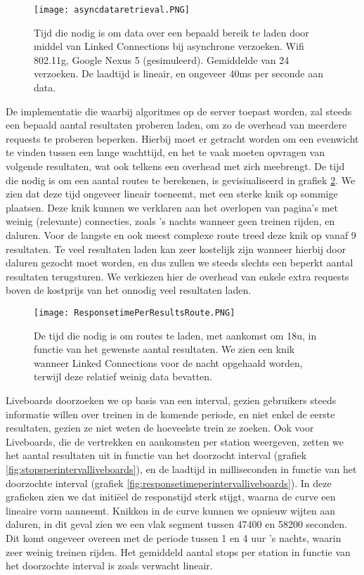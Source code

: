\begin{figure}
	\centering
	\texttt{[image: asyncdataretrieval.PNG]}
	\caption[Laadtijd asynchroon laden Linked Connections]{Tijd die nodig is om data over een bepaald bereik te laden door middel van Linked Connections bij asynchrone verzoeken. Wifi 802.11g, Google Nexus 5 (gesimuleerd). Gemiddelde van 24 verzoeken. De laadtijd is lineair, en ongeveer 40ms per seconde aan data.}
	\label{fig:asyncdataretrieval}
\end{figure}

De implementatie die waarbij algoritmes op de server toepast worden, zal steeds een bepaald aantal resultaten proberen laden, om zo de overhead van meerdere requests te proberen beperken. Hierbij moet er getracht worden om een evenwicht te vinden tussen een lange wachttijd, en het te vaak moeten opvragen van volgende resultaten, wat ook telkens een overhead met zich meebrengt. De tijd die nodig is om een aantal routes te berekenen, is gevisiualiseerd in grafiek \ref{fig:responsetimeperresultsroute}. We zien dat deze tijd ongeveer lineair toeneemt, met een sterke knik op sommige plaatsen. Deze knik kunnen we verklaren aan het overlopen van pagina's met weinig (relevante) connecties, zoals 's nachts wanneer geen treinen rijden, en daluren. Voor de langste en ook meest complexe route treed deze knik op vanaf 9 resultaten. Te veel resultaten laden kan zeer kostelijk zijn wanneer hierbij door daluren gezocht moet worden, en dus zullen we steeds slechts een beperkt aantal resultaten terugsturen. We verkiezen hier de overhead van enkele extra requests boven de kostprijs van het onnodig veel resultaten laden.

\begin{figure}
	\centering
	\texttt{[image: ResponsetimePerResultsRoute.PNG]}
	\caption[Laadtijd routes in functie van aantal resultaten]{De tijd die nodig is om routes te laden, met aankomst om 18u, in functie van het gewenste aantal resultaten. We zien een knik wanneer Linked Connections voor de nacht opgehaald worden, terwijl deze relatief weinig data bevatten.}
	\label{fig:responsetimeperresultsroute}
\end{figure}

Liveboards doorzoeken we op basis van een interval, gezien gebruikers steeds informatie willen over treinen in de komende periode, en niet enkel de eerste resultaten, gezien ze niet weten de hoeveelste trein ze zoeken. Ook voor Liveboards, die de vertrekken en aankomsten per station weergeven, zetten we het aantal resultaten uit in functie van het doorzocht interval (grafiek \ref{fig:stopsperintervalliveboards}), en de laadtijd in milliseconden in functie van het doorzochte interval (grafiek \ref{fig:responsetimeperintervalliveboards}). In deze grafieken zien we dat initiëel de responstijd sterk stijgt, waarna de curve een lineaire vorm aanneemt. Knikken in de curve kunnen we opnieuw wijten aan daluren, in dit geval zien we een vlak segment tussen 47400 en 58200 seconden. Dit komt ongeveer overeen met de periode tussen 1 en 4 uur 's nachts, waarin zeer weinig treinen rijden. Het gemiddeld aantal stops per station in functie van het doorzochte interval is zoals verwacht lineair.

